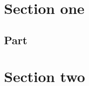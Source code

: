\documentclass[10pt,a4paper]{scrartcl}
\begin{document}
\section{Section one}\lipsum[1-3]
\subsection{Part}\lipsum[4-6]
\section{Section two}\lipsum[7-14]
\end{document}
